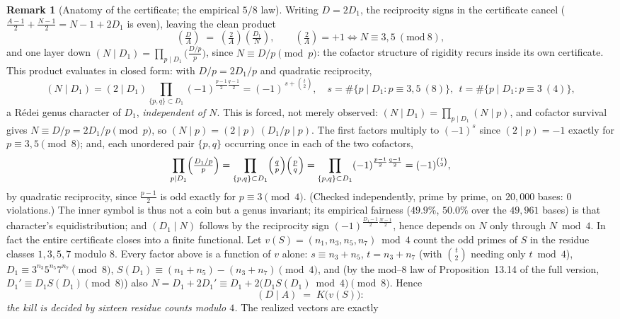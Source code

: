 \documentclass[11pt]{article}
\theoremstyle{definition}
\newtheorem{remark}[theorem]{Remark}
\begin{document}
\begin{remark}[Anatomy of the certificate; the empirical $5/8$ law]\label{rem:fiveeighths}
Writing $D=2D_1$, the reciprocity signs in the certificate cancel
\textup{(}$\tfrac{A-1}2+\tfrac{N-1}2=N-1+2D_1$ is even\textup{)}, leaving the clean product
\[ \left(\tfrac{D}{A}\right)\;=\;\left(\tfrac{2}{A}\right)\left(\tfrac{D_1}{N}\right),\qquad
\left(\tfrac{2}{A}\right)=+1\iff N\equiv3,5\ (\mathrm{mod}\ 8), \]
and one layer down $(N\mid D_1)=\prod_{p\mid D_1}\bigl(\tfrac{D/p}{p}\bigr)$, since
$N\equiv D/p\pmod p$: the cofactor structure of rigidity recurs inside its own certificate. This product evaluates in closed form: with $D/p=2D_1/p$ and quadratic
reciprocity,
\[ (N\mid D_1)=(2\mid D_1)\!\!\prod_{\{p,q\}\subset D_1}\!\!(-1)^{\frac{p-1}2\frac{q-1}2}
=(-1)^{\,s+\binom{t}{2}},\quad s=\#\{p\mid D_1:p\equiv3,5\ (8)\},\ \ t=\#\{p\mid D_1:p\equiv3\ (4)\}, \]
a R\'edei genus character of $D_1$, \emph{independent of $N$}. This is forced, not merely observed:
$(N\mid D_1)=\prod_{p\mid D_1}(N\mid p)$, and cofactor survival gives $N\equiv D/p=2D_1/p\pmod p$, so
$(N\mid p)=(2\mid p)\,(D_1/p\mid p)$. The first factors multiply to $(-1)^{s}$ since $(2\mid p)=-1$
exactly for $p\equiv3,5\pmod 8$; and, each unordered pair $\{p,q\}$ occurring once in each of the two
cofactors,
\[ \prod_{p\mid D_1}\Bigl(\tfrac{D_1/p}{p}\Bigr)=\prod_{\{p,q\}\subset D_1}\Bigl(\tfrac qp\Bigr)
\Bigl(\tfrac pq\Bigr)=\prod_{\{p,q\}\subset D_1}(-1)^{\frac{p-1}2\frac{q-1}2}=(-1)^{\binom t2}, \]
by quadratic reciprocity, since $\tfrac{p-1}2$ is odd exactly for $p\equiv3\pmod4$. (Checked
independently, prime by prime, on $20{,}000$ bases: $0$ violations.) The inner symbol is thus not a coin but a genus invariant; its empirical fairness
($49.9\%$, $50.0\%$ over the $49{,}961$ bases) is that character's equidistribution; and
$(D_1\mid N)$ follows by the reciprocity sign $(-1)^{\frac{D_1-1}2\frac{N-1}2}$, hence depends on $N$
only through $N\bmod4$. In fact the entire certificate closes into a finite functional. Let
$v(S)=(n_1,n_3,n_5,n_7)\bmod4$ count the odd primes of $S$ in the residue classes $1,3,5,7$ modulo
$8$. Every factor above is a function of $v$ alone: $s\equiv n_3+n_5$, $t=n_3+n_7$ (with
$\binom t2$ needing only $t\bmod4$), $D_1\equiv3^{n_3}5^{n_5}7^{n_7}\pmod8$,
$S(D_1)\equiv(n_1+n_5)-(n_3+n_7)\pmod4$, and (by the mod--$8$ law of
Proposition~13.14 of the full version, $D_1'\equiv D_1S(D_1)\pmod8$) also
$N=D_1+2D_1'\equiv D_1+2\bigl(D_1S(D_1)\bmod4\bigr)\pmod8$. Hence
\[ (D\mid A)\;=\;K\bigl(v(S)\bigr): \]
\emph{the kill is decided by sixteen residue counts modulo $4$.} The realized vectors are exactly

\end{remark}
\end{document}
